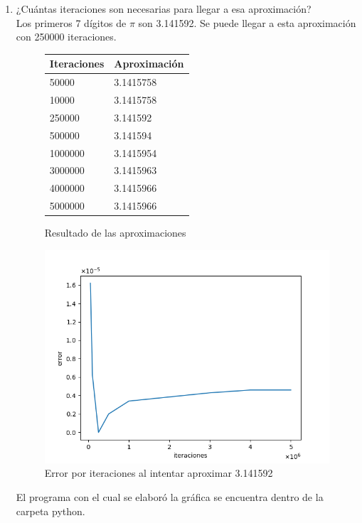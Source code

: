 \documentclass{article}
\begin{document}
\begin{enumerate}
{\begin{enumerate}
                \item ¿Cuántas iteraciones son necesarias para llegar a esa
                aproximación? \\
                Los primeros 7 dígitos de $\pi$ son 3.141592\cite{pi dig}. Se puede llegar a esta aproximación con 250000 iteraciones.
                \begin{figure}[H]
                    \centering
                    \caption{Resultado de las aproximaciones}
                    \label{appVal}
                    \begin{tabular}{|l|l|}
                        \hline
                        Iteraciones & Aproximación \\ \hline
                        50000       & 3.1415758    \\ \hline
                        10000       & 3.1415758    \\ \hline
                        250000      & 3.141592     \\ \hline
                        500000      & 3.141594     \\ \hline
                        1000000     & 3.1415954    \\ \hline
                        3000000     & 3.1415963    \\ \hline
                        4000000     & 3.1415966    \\ \hline
                        5000000     & 3.1415966      \\ \hline
                    \end{tabular}
                \end{figure}
                \begin{figure}[H]
                    \centering
                    \caption{Error por iteraciones al intentar aproximar 3.141592}
                    \label{err}
                    \includegraphics[scale=0.5]{python/error.png}
                \end{figure} 
            	El programa con el cual se elaboró la gráfica se encuentra dentro de la carpeta python.\\
            	           

\end{enumerate}}
\end{enumerate}
\end{document}
